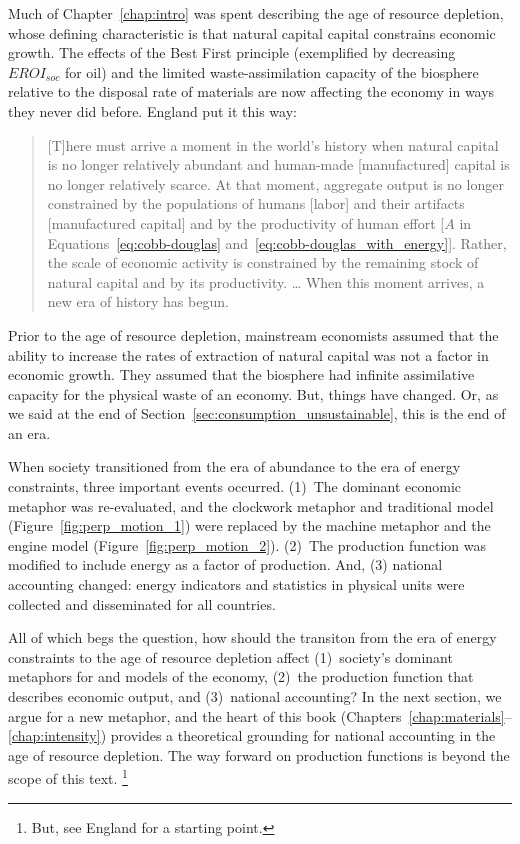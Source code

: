 Much of Chapter~\ref{chap:intro} was spent
describing the age of resource depletion,
whose defining characteristic
is that natural capital capital constrains economic growth.
The effects of the Best First principle (exemplified by decreasing $EROI_{soc}$ for oil)
and the limited waste-assimilation capacity of the biosphere
relative to the disposal rate of materials
are now affecting the economy in ways they never did before.
England put it this way:
%
\begin{quote}
	[T]here must arrive a moment in the world's history 
	when natural capital is no longer relatively abundant and 
	human-made [manufactured] capital is no longer relatively scarce. 
	At that moment, aggregate output is no longer constrained 
	by the populations of humans [labor] and their artifacts [manufactured capital]
	and by the productivity of human effort [$A$ in 
	Equations~\ref{eq:cobb-douglas} and~\ref{eq:cobb-douglas_with_energy}]. 
	Rather, the scale of economic activity is constrained 
	by the remaining stock of natural capital and by its productivity. 
	\dots
	When this moment arrives, a new era of history has begun.\cite[p.~430]{England:2000aa}
\end{quote}
%
Prior to the age of resource depletion,
mainstream economists assumed that the ability to increase 
the rates of extraction of natural capital 
was not a factor in economic growth.
They assumed that the biosphere had infinite assimilative capacity
for the physical waste of an economy.
But, things have changed. 
Or, as we said at the end of Section~\ref{sec:consumption_unsustainable}, 
this is the end of an era.

When society transitioned from the era of abundance 
to the era of energy constraints,
three important events occurred.
(1)~The dominant economic metaphor was re-evaluated, and 
the clockwork metaphor and traditional model (Figure~\ref{fig:perp_motion_1})
were replaced by 
the machine metaphor and the engine model (Figure~\ref{fig:perp_motion_2}).
(2)~The production function was modified to include energy as a factor of production.
And, (3) national accounting changed: energy indicators and statistics 
in physical units were collected and disseminated for all countries.

All of which begs the question, 
how should the transiton 
from the era of energy constraints 
to the age of resource depletion affect 
(1)~society's dominant metaphors for and models of the economy,
(2)~the production function that describes economic output, and 
(3)~national accounting?
In the next section, we argue for a new metaphor, 
and the heart of this book (Chapters~\ref{chap:materials}--\ref{chap:intensity})
provides a theoretical grounding for national accounting in the age of resource depletion.
The way forward on production functions
is beyond the scope of this text.%
	\footnote{
	But, see England for a starting point.\cite{England:2000aa}
	}


